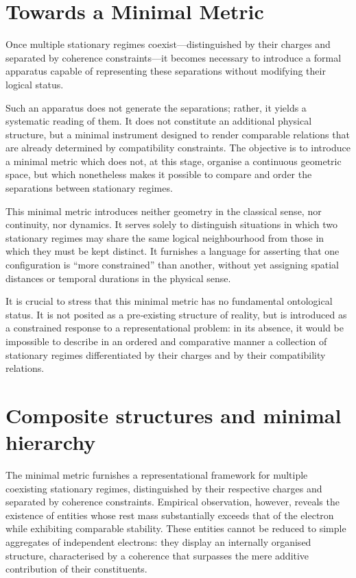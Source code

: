 \documentclass[11pt,a4paper]{article}
\begin{document}
\section{Towards a Minimal Metric}

Once multiple stationary regimes coexist—distinguished by their charges and separated by coherence constraints—it becomes necessary to introduce a formal apparatus capable of representing these separations without modifying their logical status. 

Such an apparatus does not generate the separations; rather, it yields a systematic reading of them. It does not constitute an additional physical structure, but a minimal instrument designed to render comparable relations that are already determined by compatibility constraints. The objective is to introduce a minimal metric which does not, at this stage, organise a continuous geometric space, but which nonetheless makes it possible to compare and order the separations between stationary regimes. 

This minimal metric introduces neither geometry in the classical sense, nor continuity, nor dynamics. It serves solely to distinguish situations in which two stationary regimes may share the same logical neighbourhood from those in which they must be kept distinct. It furnishes a language for asserting that one configuration is “more constrained” than another, without yet assigning spatial distances or temporal durations in the physical sense. 

It is crucial to stress that this minimal metric has no fundamental ontological status. It is not posited as a pre‑existing structure of reality, but is introduced as a constrained response to a representational problem: in its absence, it would be impossible to describe in an ordered and comparative manner a collection of stationary regimes differentiated by their charges and by their compatibility relations.

\section{Composite structures and minimal hierarchy}
The minimal metric furnishes a representational framework for multiple coexisting stationary regimes, distinguished by their respective charges and separated by coherence constraints. Empirical observation, however, reveals the existence of entities whose rest mass substantially exceeds that of the electron while exhibiting comparable stability. These entities cannot be reduced to simple aggregates of independent electrons: they display an internally organised structure, characterised by a coherence that surpasses the mere additive contribution of their constituents. 
\end{document}
